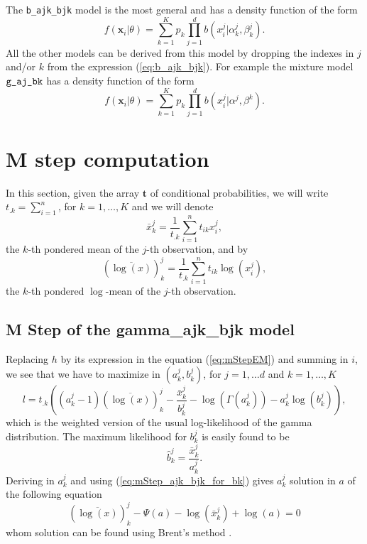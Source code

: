 \documentclass[a4paper,10pt]{article}
\newcommand{\bx}{\mathbf{x}}
\newcommand{\bt}{\mathbf{t}}
\begin{document}
The \verb+b_ajk_bjk+ model is the most general and has a density function of the form
\begin{equation}\label{eq:b_ajk_bjk}
  f({\bx}_i|\theta) = \sum_{k=1}^K p_k \prod_{j=1}^d b(x^j_{i}| \alpha^j_{k},\beta^j_{k}).
\end{equation}
All the other models can be derived from this model by dropping the indexes in $j$ and/or $k$
from the expression (\ref{eq:b_ajk_bjk}). For example the mixture model $\verb+g_aj_bk+$ has a density
function of the form
\begin{equation}\label{eq:b_aj_bk}
  f({\bx}_i|\theta) = \sum_{k=1}^K p_k \prod_{j=1}^d b(x^j_{i}| \alpha^j,\beta^{k}).
\end{equation}




\appendix

\section{M step computation}
In this section, given the array $\bt$ of conditional probabilities, we will write
$t_{.k} = \sum_{i=1}^n$, for $k=1,\ldots,K$ and we will denote
$$
\bar{x}^j_k = \frac{1}{t_{.k}} \sum_{i=1}^n t_{ik} x^j_i,
$$
the $k$-th pondered mean of the $j$-th observation, and by
$$
(\overline{\log(x)})^j_k = \frac{1}{t_{.k}} \sum_{i=1}^n t_{ik} \log(x^j_i),
$$
the $k$-th pondered $\log$-mean of the $j$-th observation.

\subsection{M Step of the gamma\_ajk\_bjk model}
Replacing $h$ by its expression in the equation (\ref{eq:mStepEM}) and summing in $i$, we see that we have to maximize in
$(a^j_k,b^j_k)$, for $j=1,\ldots d$ and $k=1,\ldots, K$
\begin{equation}\label{eq:mStep_ajk_bjk}
l = t_{.k} \left( (a^j_k-1)(\overline{\log(x)})^j_k - \frac{\bar{x}^j_k}{b^j_k} - \log(\Gamma(a^j_k)) - a^j_k \log(b^j_k) \right),
\end{equation}
which is the weighted version of the usual log-likelihood of the gamma distribution. The maximum likelihood for $b^j_k$ is
easily found to be
\begin{equation}\label{eq:mStep_ajk_bjk_for_bk}
\hat{b}^j_k = \frac{\bar{x}^j_k}{a^j_k}.
\end{equation}
Deriving in $a^j_k$ and using (\ref{eq:mStep_ajk_bjk_for_bk}) gives $a^j_k$ solution in $a$ of the
following equation
\begin{equation}\label{eq:mStep_ajk_bjk_zero}
  (\overline{\log(x)})^j_k - \Psi(a) - \log(\bar{x}^j_k) + \log(a) =0
\end{equation}
whom solution can be found using Brent's method \cite{Brent1973}.
\end{document}
